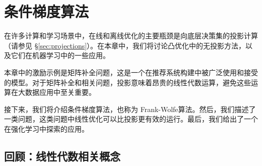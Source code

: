 

\chapter{
	条件梯度算法
	}\label{subsec:cond_grad_intro}


在许多计算和学习场景中，在线和离线优化的主要瓶颈是向底层决策集的投影计算（请参见 \S \ref{sec:projections}）。在本章中，我们将讨论凸优化中的无投影方法，以及它们在机器学习中的一些应用。

本章中的激励示例是矩阵补全问题，这是一个在推荐系统构建中被广泛使用和接受的模型。对于矩阵补全和相关问题，投影意味着昂贵的线性代数运算，避免这些运算在大数据应用中至关重要。

接下来，我们将介绍条件梯度算法，也称为 Frank-Wolfe算法。然后，我们描述了一类问题，这类问题中线性优化可以比投影更有效的运行。最后，我们给出了一个在强化学习中探索的应用。

\section{
    回顾：线性代数相关概念
    }

